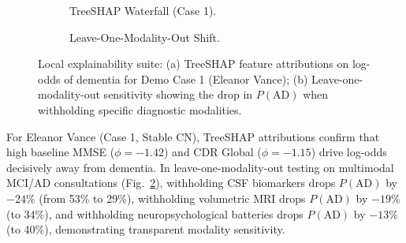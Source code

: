 \documentclass[11pt,a4paper]{article}
\begin{document}
\begin{figure}[t]
\centering
\begin{subfigure}[t]{0.48\linewidth}
    \centering
    \caption{TreeSHAP Waterfall (Case 1).}
    \label{fig:shap_waterfall_case1}
\end{subfigure}
\hfill
\begin{subfigure}[t]{0.48\linewidth}
    \centering
    \caption{Leave-One-Modality-Out Shift.}
    \label{fig:loo_modality}
\end{subfigure}
\caption{Local explainability suite: (a) TreeSHAP feature attributions on log-odds of dementia for Demo Case 1 (Eleanor Vance); (b) Leave-one-modality-out sensitivity showing the drop in $P(\text{AD})$ when withholding specific diagnostic modalities.}
\label{fig:explainability_panels}
\end{figure}

For Eleanor Vance (Case 1, Stable CN), TreeSHAP attributions confirm that high baseline MMSE ($\phi = -1.42$) and CDR Global ($\phi = -1.15$) drive log-odds decisively away from dementia. In leave-one-modality-out testing on multimodal MCI/AD consultations (Fig.~\ref{fig:loo_modality}), withholding CSF biomarkers drops $P(\text{AD})$ by $-24\%$ (from 53\% to 29\%), withholding volumetric MRI drops $P(\text{AD})$ by $-19\%$ (to 34\%), and withholding neuropsychological batteries drops $P(\text{AD})$ by $-13\%$ (to 40\%), demonstrating transparent modality sensitivity.
\end{document}
